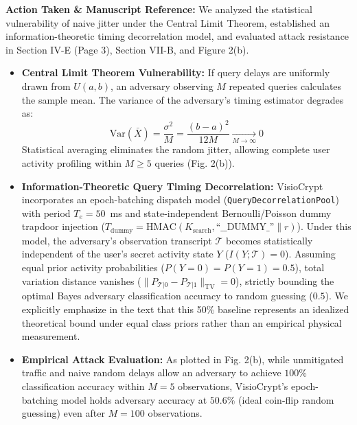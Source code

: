 \documentclass[11pt,a4paper]{article}
\begin{document}
\begin{responsebox}
\textbf{Action Taken \& Manuscript Reference:} We analyzed the statistical vulnerability of naive jitter under the Central Limit Theorem, established an information-theoretic timing decorrelation model, and evaluated attack resistance in Section IV-E (Page 3), Section VII-B, and Figure 2(b).

\begin{itemize}[itemsep=2pt]
    \item \textbf{Central Limit Theorem Vulnerability:} If query delays are uniformly drawn from $U(a, b)$, an adversary observing $M$ repeated queries calculates the sample mean. The variance of the adversary's timing estimator degrades as:
    \begin{equation}
    \text{Var}(\bar{X}) = \frac{\sigma^2}{M} = \frac{(b - a)^2}{12 M} \xrightarrow[M \to \infty]{} 0
    \end{equation}
    Statistical averaging eliminates the random jitter, allowing complete user activity profiling within $M \ge 5$ queries (Fig. 2(b)).
    \item \textbf{Information-Theoretic Query Timing Decorrelation:} VisioCrypt incorporates an epoch-batching dispatch model (\texttt{QueryDecorrelationPool}) with period $T_e = 50$~ms and state-independent Bernoulli/Poisson dummy trapdoor injection ($T_{\text{dummy}} = \text{HMAC}(K_{\text{search}}, \text{``\_\_DUMMY\_''}\parallel r)$). Under this model, the adversary's observation transcript $\mathcal{T}$ becomes statistically independent of the user's secret activity state $Y$ ($I(Y; \mathcal{T}) = 0$). Assuming equal prior activity probabilities ($P(Y=0) = P(Y=1) = 0.5$), total variation distance vanishes ($\|P_{\mathcal{T}|0} - P_{\mathcal{T}|1}\|_{\text{TV}} = 0$), strictly bounding the optimal Bayes adversary classification accuracy to random guessing ($0.5$). We explicitly emphasize in the text that this 50\% baseline represents an idealized theoretical bound under equal class priors rather than an empirical physical measurement.
    \item \textbf{Empirical Attack Evaluation:} As plotted in Fig. 2(b), while unmitigated traffic and naive random delays allow an adversary to achieve $100\%$ classification accuracy within $M = 5$ observations, VisioCrypt's epoch-batching model holds adversary accuracy at $50.6\%$ (ideal coin-flip random guessing) even after $M = 100$ observations.
\end{itemize}
\end{responsebox}
\end{document}
